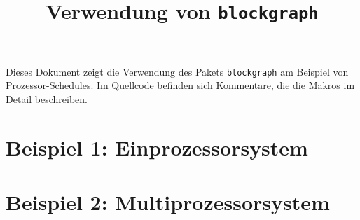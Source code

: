 \documentclass[ngerman,parskip=half]{scrartcl}
\title{Verwendung von \texttt{blockgraph}}
\date{}
\begin{document}
\maketitle

Dieses Dokument zeigt die Verwendung des Pakets \texttt{blockgraph} am Beispiel von Prozessor-Schedules. Im Quellcode befinden sich Kommentare, die die Makros im Detail beschreiben.

\section*{Beispiel 1: Einprozessorsystem}

\begin{blockgraph}{15}{1}{0.4}


\end{blockgraph}



\section*{Beispiel 2: Multiprozessorsystem}

\begin{blockgraph}{20}{4}{0.4}






\end{blockgraph}
\end{document}
